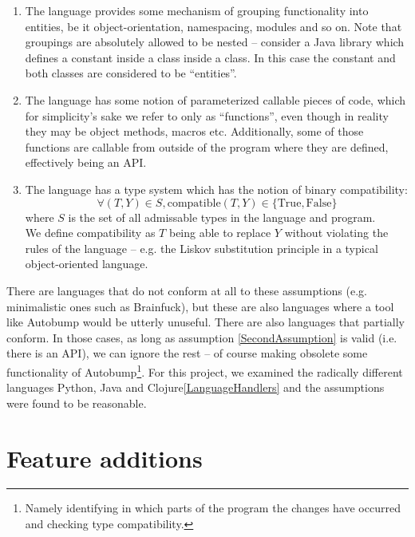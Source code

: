 \documentclass{l4proj}
\begin{document}
\begin{enumerate}
\item The language provides some mechanism of grouping functionality
into entities, be it object-orientation, namespacing, modules and so
on. Note that groupings are absolutely allowed to be nested --
consider a Java library which defines a constant inside a class inside
a class. In this case the constant and both classes are considered to
be ``entities''.
\item The language has some notion of parameterized callable pieces of
code, which for simplicity's sake we refer to only as ``functions'',
even though in reality they may be object methods, macros etc.
Additionally, some of those functions are callable from outside
of the program where they are defined, effectively being an API.
\label{SecondAssumption}
\item The language has a type system which has the notion of binary
compatibility:
\begin{equation}
\forall(T,Y) \in S, \mathrm{compatible}(T,Y) \in \{\mathrm{True},\mathrm{False}\}
\end{equation}
where $S$ is the set of all admissable types in the language and
program. \\

We define compatibility as $T$ being able to replace $Y$
without violating the rules of the language -- e.g. the Liskov
substitution principle\cite{Liskov} in a typical object-oriented
language.
\end{enumerate}

There are languages that do not conform at all to these assumptions
(e.g. minimalistic ones such as Brainfuck\cite{Brainfuck}), but these
are also languages where a tool like Autobump would be utterly
unuseful. There are also languages that partially conform. In those
cases, as long as assumption \ref{SecondAssumption} is valid (i.e.
there is an API), we can ignore the rest -- of course making obsolete
some functionality of Autobump\footnote{Namely identifying in which
parts of the program the changes have occurred and checking type
compatibility.}. For this project, we examined the radically
different languages Python, Java and Clojure\ref{LanguageHandlers} and
the assumptions were found to be reasonable.

\section{Feature additions}
\end{document}
